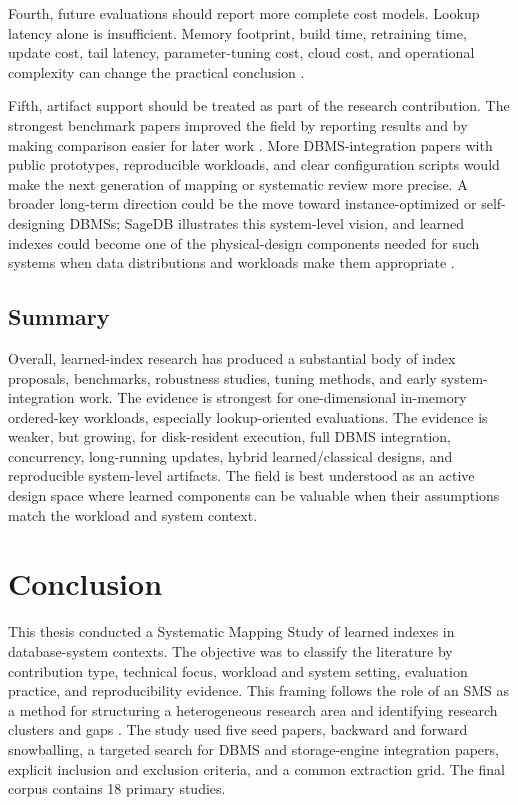 \documentclass[a4paper, 12pt, twoside]{report}
\begin{document}
Fourth, future evaluations should report more complete cost models. Lookup latency alone is insufficient. Memory footprint, build time, retraining time, update cost, tail latency, parameter-tuning cost, cloud cost, and operational complexity can change the practical conclusion \cite{marcus2020benchmarking,maltry2022critical,wang2025tuning,chatterjee2024limousine}.

Fifth, artifact support should be treated as part of the research contribution. The strongest benchmark papers improved the field by reporting results and by making comparison easier for later work \cite{marcus2020benchmarking,sun2023learned,wongkham2022ready}. More DBMS-integration papers with public prototypes, reproducible workloads, and clear configuration scripts would make the next generation of mapping or systematic review more precise. A broader long-term direction could be the move toward instance-optimized or self-designing DBMSs; SageDB illustrates this system-level vision, and learned indexes could become one of the physical-design components needed for such systems when data distributions and workloads make them appropriate \cite{ding2022sagedb}.

\section{Summary}

Overall, learned-index research has produced a substantial body of index proposals, benchmarks, robustness studies, tuning methods, and early system-integration work. The evidence is strongest for one-dimensional in-memory ordered-key workloads, especially lookup-oriented evaluations. The evidence is weaker, but growing, for disk-resident execution, full DBMS integration, concurrency, long-running updates, hybrid learned/classical designs, and reproducible system-level artifacts. The field is best understood as an active design space where learned components can be valuable when their assumptions match the workload and system context.

\chapter{Conclusion}

This thesis conducted a Systematic Mapping Study of learned indexes in database-system contexts. The objective was to classify the literature by contribution type, technical focus, workload and system setting, evaluation practice, and reproducibility evidence. This framing follows the role of an SMS as a method for structuring a heterogeneous research area and identifying research clusters and gaps \cite{petersen2008,petersen2015}. The study used five seed papers, backward and forward snowballing, a targeted search for DBMS and storage-engine integration papers, explicit inclusion and exclusion criteria, and a common extraction grid. The final corpus contains 18 primary studies.
\end{document}
